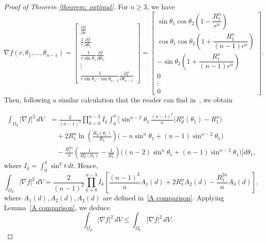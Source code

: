 \documentclass[12pt,reqno]{amsart}
\numberwithin{equation}{section}
\numberwithin{theorem}{section}
\numberwithin{equation}{section}
\numberwithin{theorem}{section}
\begin{document}
\begin{proof} [Proof of Theorem \ref{theorem: optimal}]
\medskip
For $n \geq 3$, we have
\[
\nabla f(r, \theta_1, \dots, \theta_{n-1})
= \begin{bmatrix}
\displaystyle \frac{\partial f}{\partial r} \\[4pt]
\displaystyle \frac{1}{r}\frac{\partial f}{\partial \theta_1} \\[4pt]
\displaystyle \frac{1}{r \sin \theta_1}\frac{\partial f}{\partial \theta_2} \\[4pt]
\vdots \\[4pt]
\displaystyle \frac{1}{r \sin \theta_1 \cdots \sin \theta_{n-2}}\frac{\partial f}{\partial \theta_{n-1}}
\end{bmatrix}
=
\begin{bmatrix}
\sin \theta_1 \cos \theta_2 \left( 1 - \dfrac{R_1^n}{r^n} \right) \\[4pt]
\cos \theta_1 \cos \theta_2 \left( 1 + \dfrac{R_1^n}{(n-1)r^n} \right) \\[4pt]
- \sin \theta_2 \left( 1 + \dfrac{R_1^n}{(n-1)r^n} \right) \\[4pt]
0 \\[4pt]
\vdots \\[4pt]
0
\end{bmatrix}.
\]
Then, following a similar calculation that the reader can find in~\cite{ftouhi2022place}, we obtain

\[
\begin{aligned}
\int_{\Omega_d} |\nabla f|^2 \, dV
&= 
\frac{2}{(n-1)^2} 
\prod_{k=0}^{n-3} I_k
\int_{0}^{\pi}
\Bigg[
\sin^{n-2}\!\theta_1 \,
\frac{(n-1)^2}{n}
\big( R_d^n(\theta_1) - R_1^n \big)
\\[4pt]
&\quad
+ 2R_1^n 
\ln\!\left( \frac{R_d(\theta_1)}{R_1} \right)
\!\big( -n\sin^n\!\theta_1 + (n-1)\sin^{n-2}\!\theta_1 \big)
\\[4pt]
&\quad
- \frac{R_1^{2n}}{n}
\!\left( \frac{1}{R_d^n(\theta_1)} - \frac{1}{R_1^n} \right)
\!\big( (n-2)\sin^n\!\theta_1 + (n-1)\sin^{n-2}\!\theta_1 \big)
\Bigg]
d\theta_1,
\end{aligned}
\]
where $I_k = \int_0^{\pi} \sin^k t \, dt$.  
Hence,
\[
    \int_{\Omega_d} |\nabla f|^2 \, dV
    =
    \frac{2}{(n-1)^2} \prod_{k=0}^{n-3} I_k
    \left[
        \frac{(n-1)^2}{n}A_1(d)
        + 2R_1^n A_2(d)
        - \frac{R_1^{2n}}{n}A_3(d)
    \right],
\]
where $A_1(d), A_2(d), A_3(d)$ are defined in~\eqref{A comparison}.  
Applying Lemma~\ref{A comparison}, we deduce
\[
    \int_{\Omega_{d}} |\nabla f|^2 \, dV 
    \leq 
    \int_{\Omega_{0}} |\nabla f|^2 \, dV.
\]


\end{proof}
\end{document}
